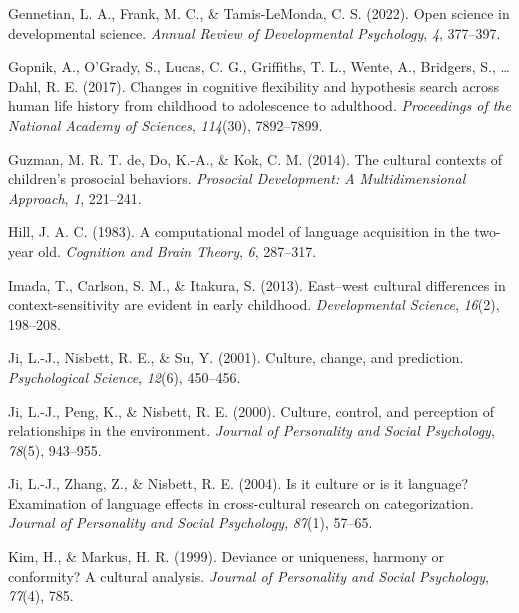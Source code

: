 \documentclass[10pt, letterpaper]{article}
\newenvironment{CSLReferences}%
  {}%
  {\par}
\begin{document}
\begin{CSLReferences}{1}{0}
\leavevmode{}%
Gennetian, L. A., Frank, M. C., \& Tamis-LeMonda, C. S. (2022). Open
science in developmental science. \emph{Annual Review of Developmental
Psychology}, \emph{4}, 377--397.

\leavevmode{}%
Gopnik, A., O'Grady, S., Lucas, C. G., Griffiths, T. L., Wente, A.,
Bridgers, S., \ldots{} Dahl, R. E. (2017). Changes in cognitive
flexibility and hypothesis search across human life history from
childhood to adolescence to adulthood. \emph{Proceedings of the National
Academy of Sciences}, \emph{114}(30), 7892--7899.

\leavevmode{}%
Guzman, M. R. T. de, Do, K.-A., \& Kok, C. M. (2014). The cultural
contexts of children's prosocial behaviors. \emph{Prosocial Development:
A Multidimensional Approach}, \emph{1}, 221--241.

\leavevmode{}%
Hill, J. A. C. (1983). A computational model of language acquisition in
the two-year old. \emph{Cognition and Brain Theory}, \emph{6}, 287--317.

\leavevmode{}%
Imada, T., Carlson, S. M., \& Itakura, S. (2013). East--west cultural
differences in context-sensitivity are evident in early childhood.
\emph{Developmental Science}, \emph{16}(2), 198--208.

\leavevmode{}%
Ji, L.-J., Nisbett, R. E., \& Su, Y. (2001). Culture, change, and
prediction. \emph{Psychological Science}, \emph{12}(6), 450--456.

\leavevmode{}%
Ji, L.-J., Peng, K., \& Nisbett, R. E. (2000). Culture, control, and
perception of relationships in the environment. \emph{Journal of
Personality and Social Psychology}, \emph{78}(5), 943--955.

\leavevmode{}%
Ji, L.-J., Zhang, Z., \& Nisbett, R. E. (2004). Is it culture or is it
language? Examination of language effects in cross-cultural research on
categorization. \emph{Journal of Personality and Social Psychology},
\emph{87}(1), 57--65.

\leavevmode{}%
Kim, H., \& Markus, H. R. (1999). Deviance or uniqueness, harmony or
conformity? A cultural analysis. \emph{Journal of Personality and Social
Psychology}, \emph{77}(4), 785.


\end{CSLReferences}
\end{document}
